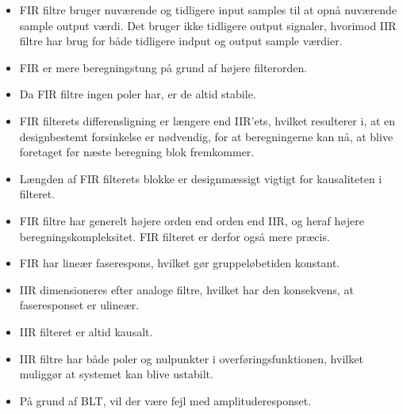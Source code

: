 \begin{itemize}[noitemsep,nolistsep]
	\item FIR filtre bruger nuværende og tidligere input samples til at opnå nuværende sample output værdi. Det bruger ikke tidligere output signaler, hvorimod IIR filtre har brug for både tidligere indput og output sample værdier.
	\item FIR er mere beregningstung på grund af højere filterorden.
	\item Da FIR filtre ingen poler har, er de altid stabile.
	\item FIR filterets differensligning er længere end IIR'ets, hvilket resulterer i, at en designbestemt forsinkelse er nødvendig, for at beregningerne kan nå, at blive foretaget før næste beregning blok fremkommer.
	\item Længden af FIR filterets blokke er designmæssigt vigtigt for kausaliteten i filteret.
	\item FIR filtre har generelt højere orden end orden end IIR, og heraf højere beregningskompleksitet. FIR filteret er derfor også mere præcis.	
	\item FIR har lineær faserespons, hvilket gør gruppeløbetiden konstant.
	\item IIR dimensioneres efter analoge filtre, hvilket har den konsekvens, at faseresponset er ulineær.
	\item IIR filteret er altid kausalt.
	\item IIR filtre har både poler og nulpunkter i overføringsfunktionen, hvilket muliggør at systemet kan blive ustabilt.
	\item På grund af BLT, vil der være fejl med amplituderesponset.
\end{itemize}



